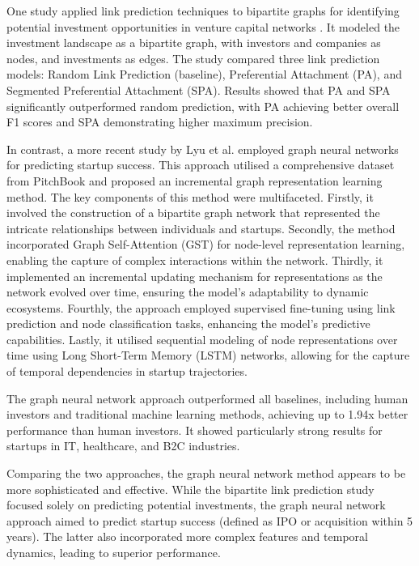 \documentclass[a4paper, oneside]{discothesis}
\begin{document}
One study applied link prediction techniques to bipartite graphs for identifying potential investment opportunities in venture capital networks \cite{predictVCbipartite}. It modeled the investment landscape as a bipartite graph, with investors and companies as nodes, and investments as edges. The study compared three link prediction models: Random Link Prediction (baseline), Preferential Attachment (PA), and Segmented Preferential Attachment (SPA). Results showed that PA and SPA significantly outperformed random prediction, with PA achieving better overall F1 scores and SPA demonstrating higher maximum precision.

In contrast, a more recent study by Lyu et al. \cite{lyu2023graph} employed graph neural networks for predicting startup success. This approach utilised a comprehensive dataset from PitchBook and proposed an incremental graph representation learning method. The key components of this method were multifaceted. Firstly, it involved the construction of a bipartite graph network that represented the intricate relationships between individuals and startups. Secondly, the method incorporated Graph Self-Attention (GST) for node-level representation learning, enabling the capture of complex interactions within the network. Thirdly, it implemented an incremental updating mechanism for representations as the network evolved over time, ensuring the model's adaptability to dynamic ecosystems. Fourthly, the approach employed supervised fine-tuning using link prediction and node classification tasks, enhancing the model's predictive capabilities. Lastly, it utilised sequential modeling of node representations over time using Long Short-Term Memory (LSTM) networks, allowing for the capture of temporal dependencies in startup trajectories.

The graph neural network approach outperformed all baselines, including human investors and traditional machine learning methods, achieving up to 1.94x better performance than human investors. It showed particularly strong results for startups in IT, healthcare, and B2C industries.

Comparing the two approaches, the graph neural network method appears to be more sophisticated and effective. While the bipartite link prediction study focused solely on predicting potential investments, the graph neural network approach aimed to predict startup success (defined as IPO or acquisition within 5 years). The latter also incorporated more complex features and temporal dynamics, leading to superior performance.
\end{document}
